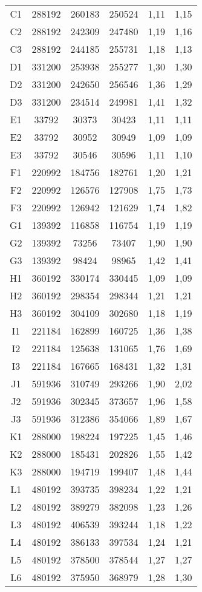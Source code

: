 \begin{center}
\begin{longtable}{cccccc}
    C1    & 288192 & 260183 & 250524 & 1,11  & 1,15 \\
    C2    & 288192 & 242309 & 247480 & 1,19  & 1,16 \\
    C3    & 288192 & 244185 & 255731 & 1,18  & 1,13 \\
    D1    & 331200 & 253938 & 255277 & 1,30  & 1,30 \\
    D2    & 331200 & 242650 & 256546 & 1,36  & 1,29 \\
    D3    & 331200 & 234514 & 249981 & 1,41  & 1,32 \\
    E1    & 33792 & 30373 & 30423 & 1,11  & 1,11 \\
    E2    & 33792 & 30952 & 30949 & 1,09  & 1,09 \\
    E3    & 33792 & 30546 & 30596 & 1,11  & 1,10 \\
    F1    & 220992 & 184756 & 182761 & 1,20  & 1,21 \\
    F2    & 220992 & 126576 & 127908 & 1,75  & 1,73 \\
    F3    & 220992 & 126942 & 121629 & 1,74  & 1,82 \\
    G1    & 139392 & 116858 & 116754 & 1,19  & 1,19 \\
    G2    & 139392 & 73256 & 73407 & 1,90  & 1,90 \\
    G3    & 139392 & 98424 & 98965 & 1,42  & 1,41 \\
    H1    & 360192 & 330174 & 330445 & 1,09  & 1,09 \\
    H2    & 360192 & 298354 & 298344 & 1,21  & 1,21 \\
    H3    & 360192 & 304109 & 302680 & 1,18  & 1,19 \\
    I1    & 221184 & 162899 & 160725 & 1,36  & 1,38 \\
    I2    & 221184 & 125638 & 131065 & 1,76  & 1,69 \\
    I3    & 221184 & 167665 & 168431 & 1,32  & 1,31 \\
    J1    & 591936 & 310749 & 293266 & 1,90  & 2,02 \\
    J2    & 591936 & 302345 & 373657 & 1,96  & 1,58 \\
    J3    & 591936 & 312386 & 354066 & 1,89  & 1,67 \\
    K1    & 288000 & 198224 & 197225 & 1,45  & 1,46 \\
    K2    & 288000 & 185431 & 202826 & 1,55  & 1,42 \\
    K3    & 288000 & 194719 & 199407 & 1,48  & 1,44 \\
    L1    & 480192 & 393735 & 398234 & 1,22  & 1,21 \\
    L2    & 480192 & 389279 & 382098 & 1,23  & 1,26 \\
    L3    & 480192 & 406539 & 393244 & 1,18  & 1,22 \\
    L4    & 480192 & 386133 & 397534 & 1,24  & 1,21 \\
    L5    & 480192 & 378500 & 378544 & 1,27  & 1,27 \\
    L6    & 480192 & 375950 & 368979 & 1,28  & 1,30 \\
\end{longtable}
\end{center}

